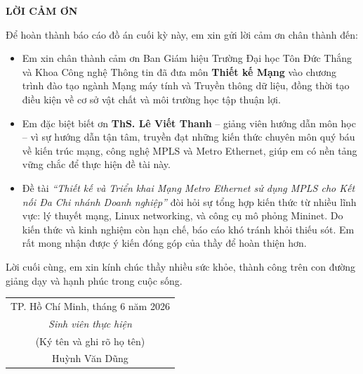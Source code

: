 \begin{center}
\pagestyle{empty}
\Large \textbf{LỜI CẢM ƠN}
\end{center}

    Để hoàn thành báo cáo đồ án cuối kỳ này, em xin gửi lời cảm ơn chân thành đến:

    \begin{itemize}
        \item Em xin chân thành cảm ơn Ban Giám hiệu Trường Đại học Tôn Đức Thắng và Khoa Công nghệ Thông tin đã đưa môn \textbf{Thiết kế Mạng} vào chương trình đào tạo ngành Mạng máy tính và Truyền thông dữ liệu, đồng thời tạo điều kiện về cơ sở vật chất và môi trường học tập thuận lợi.

        \item Em đặc biệt biết ơn \textbf{ThS. Lê Viết Thanh} -- giảng viên hướng dẫn môn học -- vì sự hướng dẫn tận tâm, truyền đạt những kiến thức chuyên môn quý báu về kiến trúc mạng, công nghệ MPLS và Metro Ethernet, giúp em có nền tảng vững chắc để thực hiện đề tài này.

        \item Đề tài \textit{``Thiết kế và Triển khai Mạng Metro Ethernet sử dụng MPLS cho Kết nối Đa Chi nhánh Doanh nghiệp''} đòi hỏi sự tổng hợp kiến thức từ nhiều lĩnh vực: lý thuyết mạng, Linux networking, và công cụ mô phỏng Mininet. Do kiến thức và kinh nghiệm còn hạn chế, báo cáo khó tránh khỏi thiếu sót. Em rất mong nhận được ý kiến đóng góp của thầy để hoàn thiện hơn.
    \end{itemize}

    Lời cuối cùng, em xin kính chúc thầy nhiều sức khỏe, thành công trên con đường giảng dạy và hạnh phúc trong cuộc sống.

    \vspace{2cm}

    \begin{flushright}
\begin{tabular}{c}
    \multicolumn{1}{r}{TP. Hồ Chí Minh, tháng 6 năm 2026}\\
    \noalign{\vspace{0.5cm}}
    \textit{Sinh viên thực hiện} \\
    (Ký tên và ghi rõ họ tên) \\
    \noalign{\vspace{2cm}}
    Huỳnh Văn Dũng \\
\end{tabular}
\end{flushright}